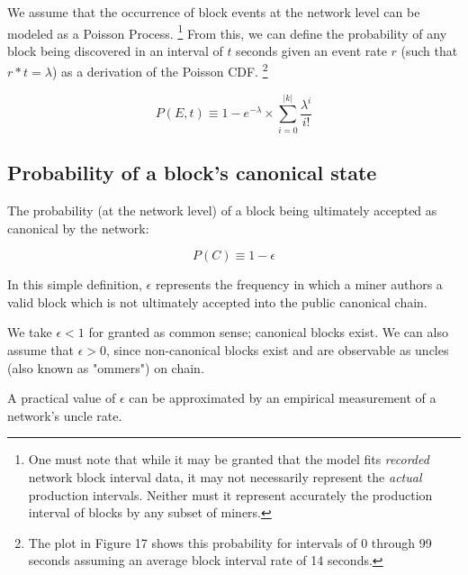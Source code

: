 \documentclass[11pt]{article}
\theoremstyle{plain}
\newcommand{\comment}[1]{}
\begin{document}
{We assume that the occurrence of block events at the network level can be
modeled as a Poisson Process.\nolinebreak
\footnote{
One must note that while it may be granted that the model fits \emph{recorded}
network block interval data, it may not necessarily represent the \emph{actual}
production intervals. Neither must it represent accurately the production
interval of blocks by any subset of miners.
}
From this, we can define the probability of any block being discovered in an
interval of $t$ seconds given an event rate $r$ (such that $r * t = \lambda$)
as a derivation of the Poisson CDF.
\footnote{
    The plot in Figure 17 shows this probability for intervals of 0 through 99
    seconds assuming an average block interval rate of 14 seconds.
}

\begin{equation}
P(E,t) \equiv 1 - e^{-\lambda} \times \sum_{i=0}^{|k|}{\frac{\lambda^{i}}{i!}} 
\end{equation}



\subsection{\normalsize{Probability of a block's canonical state}}

The probability (at the network level) of a block being ultimately accepted as
canonical by the network:

\begin{equation}
P(C) \equiv 1 - \epsilon
\end{equation}

In this simple definition, $\epsilon$ represents the frequency in which a miner
authors a valid block which is not ultimately accepted into the public canonical chain.

We take $\epsilon < 1$ for granted as common sense; canonical blocks exist.
We can also assume that $\epsilon > 0$, since non-canonical blocks exist and
are observable as uncles (also known as "ommers") on chain.

A practical value of $\epsilon$ can be approximated by an empirical measurement
of a network's uncle rate.\nolinebreak
\comment{
\footnote{
  There is a lot to say about this, and the nuances of this idea are important
for understanding what kind of approximation this is, and what its limits are.
  A few brief statements are provided for context below, but should not be
considered comprehensive or definitive:

}}}
\end{document}
